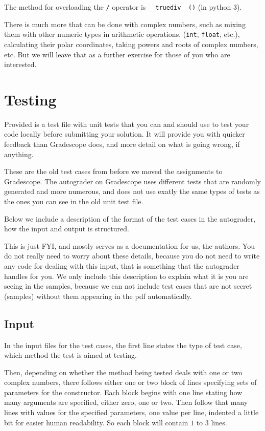 The method for overloading the \texttt{/} operator is \texttt{\_\_truediv\_\_()} (in python 3).

There is much more that can be done with complex numbers,
such as mixing them with other numeric types in arithmetic operations,
(\texttt{int}, \texttt{float}, etc.),
calculating their polar coordinates,
taking powers and roots of complex numbers, etc.
But we will leave that as a further exercise
for those of you who are interested.


\section*{Testing}

Provided is a test file with unit tests that you can and should use
to test your code locally before submitting your solution.
It will provide you with quicker feedback than Gradescope does,
and more detail on what is going wrong, if anything.

These are the old test cases
from before we moved the assignments to Gradescope.
The autograder on Gradescope uses different tests
that are randomly generated and more numerous,
and does not use exatly the same types of tests
as the ones you can see in the old unit test file.

Below we include a description of the format
of the test cases in the autograder,
how the input and output is structured.

This is just FYI, and mostly serves as a documentation for us, the authors.
You do not really need to worry about these details,
because you do not need to write any code for dealing with this input,
that is something that the autograder handles for you.
We only include this description to explain what it is you are seeing in the samples,
because we can not include test cases that are not secret (samples)
without them appearing in the pdf automatically.

\subsection*{Input}

In the input files for the test cases,
the first line states the type of test case,
which method the test is aimed at testing.

Then, depending on whether the method being tested
deals with one or two complex numbers,
there follows either one or two block of lines
specifying sets of parameters for the constructor.
Each block begins with one line stating how many arguments are specified,
either zero, one or two.
Then follow that many lines with values for the specified parameters,
one value per line, indented a little bit for easier human readability.
So each block will contain $1$ to $3$ lines.

